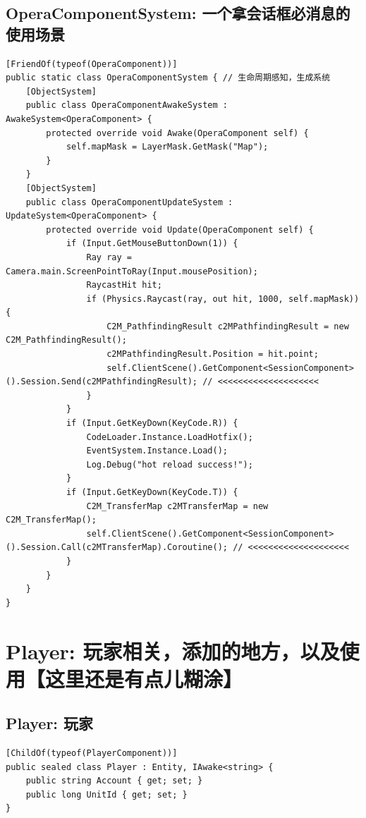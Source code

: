 \documentclass[9pt, b5paper]{article}
\begin{document}
\subsection{OperaComponentSystem: 一个拿会话框必消息的使用场景}
\label{sec-8-3}
\begin{verbatim}
[FriendOf(typeof(OperaComponent))]
public static class OperaComponentSystem { // 生命周期感知，生成系统
    [ObjectSystem]
    public class OperaComponentAwakeSystem : AwakeSystem<OperaComponent> {
        protected override void Awake(OperaComponent self) {
            self.mapMask = LayerMask.GetMask("Map");
        }
    }
    [ObjectSystem]
    public class OperaComponentUpdateSystem : UpdateSystem<OperaComponent> {
        protected override void Update(OperaComponent self) {
            if (Input.GetMouseButtonDown(1)) {
                Ray ray = Camera.main.ScreenPointToRay(Input.mousePosition);
                RaycastHit hit;
                if (Physics.Raycast(ray, out hit, 1000, self.mapMask)) {
                    C2M_PathfindingResult c2MPathfindingResult = new C2M_PathfindingResult();
                    c2MPathfindingResult.Position = hit.point;
                    self.ClientScene().GetComponent<SessionComponent>().Session.Send(c2MPathfindingResult); // <<<<<<<<<<<<<<<<<<<< 
                }
            }
            if (Input.GetKeyDown(KeyCode.R)) {
                CodeLoader.Instance.LoadHotfix();
                EventSystem.Instance.Load();
                Log.Debug("hot reload success!");
            }
            if (Input.GetKeyDown(KeyCode.T)) {
                C2M_TransferMap c2MTransferMap = new C2M_TransferMap();
                self.ClientScene().GetComponent<SessionComponent>().Session.Call(c2MTransferMap).Coroutine(); // <<<<<<<<<<<<<<<<<<<< 
            }
        }
    }
}
\end{verbatim}

\section{Player: 玩家相关，添加的地方，以及使用【这里还是有点儿糊涂】}
\label{sec-9}
\subsection{Player: 玩家}
\label{sec-9-1}
\begin{verbatim}
[ChildOf(typeof(PlayerComponent))]
public sealed class Player : Entity, IAwake<string> {
    public string Account { get; set; }
    public long UnitId { get; set; }
}
\end{verbatim}
\end{document}

